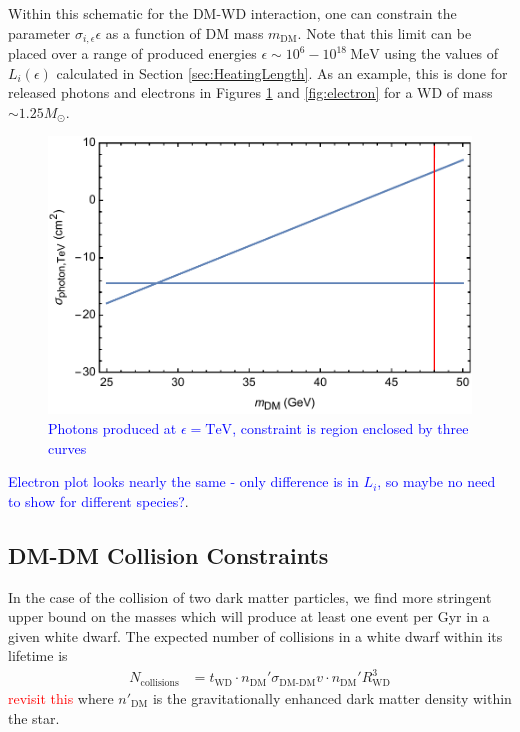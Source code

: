 \documentclass[twocolumn,showpacs,preprintnumbers,amsmath,amssymb,prd]{revtex4}
\begin{document}
Within this schematic for the DM-WD interaction, one can constrain the parameter $\sigma_{i,\epsilon} \epsilon$ as a function of DM mass $m_\text{DM}$. Note that this limit can be placed over a range of produced energies $\epsilon \sim 10^{6} - 10^{18} ~\text{MeV}$ using the values of $L_i (\epsilon)$ calculated in Section \ref{sec:HeatingLength}. As an example, this is done for released photons and electrons in Figures \ref{fig:photonconstraint} and \ref{fig:electron} for a WD of mass $\sim 1.25 M_\odot$.
\begin{figure}
\includegraphics[scale=.45]{photonconstraint.pdf}
\caption{\textcolor{blue}{Photons produced at $\epsilon = \text{TeV}$, constraint is region enclosed by three curves}}
\label{fig:photonconstraint}
\end{figure}
\textcolor{blue}{Electron plot looks nearly the same - only difference is in $L_i$, so maybe no need to show for different species?}.

\subsection{DM-DM Collision Constraints}
\label{sec:CollisionConstraints}

In the case of the collision of two dark matter particles, we find more stringent upper bound on the masses which will produce at least one event per Gyr in a given white dwarf. The expected number of collisions in a white dwarf within its lifetime is
\begin{align}
N_\text{collisions}  &= t_\text{WD} \cdot n_\text{DM}' \sigma_\text{DM-DM} v \cdot n_\text{DM}'R_\text{WD}^3
\end{align}
\textcolor{red}{revisit this}
where $n'_\text{DM}$ is the gravitationally enhanced dark matter density within the star.
\end{document}

